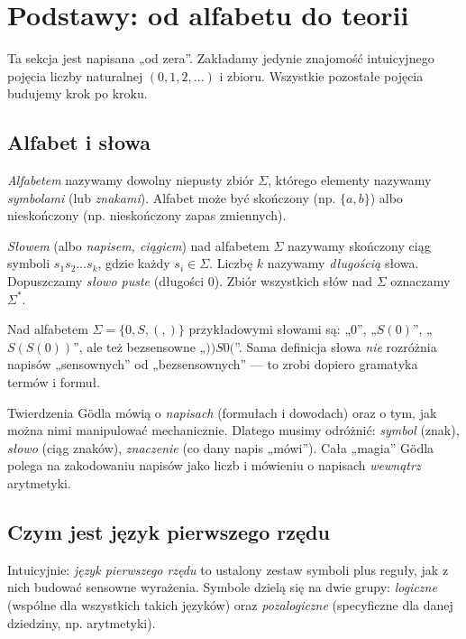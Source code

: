 \section{Podstawy: od alfabetu do teorii}\label{sec:podstawy}
Ta sekcja jest napisana „od zera”. Zakładamy jedynie znajomość intuicyjnego pojęcia liczby naturalnej $(0,1,2,\ldots)$ i zbioru. Wszystkie pozostałe pojęcia budujemy krok po kroku.

\subsection*{Alfabet i słowa}\label{sec:alfabet-slowa}
\begin{definicja}[Alfabet]\label{res:2:1}
\emph{Alfabetem} nazywamy dowolny niepusty zbiór $\Sigma$, którego elementy nazywamy \emph{symbolami} (lub \emph{znakami}). Alfabet może być skończony (np. $\{a,b\}$) albo nieskończony (np. nieskończony zapas zmiennych).
\end{definicja}

\begin{definicja}\label{res:2:2}
\emph{Słowem} (albo \emph{napisem, ciągiem}) nad alfabetem $\Sigma$ nazywamy skończony ciąg symboli $s_1s_2\ldots s_k$, gdzie każdy $s_i\in\Sigma$. Liczbę $k$ nazywamy \emph{długością} słowa. Dopuszczamy \emph{słowo puste} (długości $0$). Zbiór wszystkich słów nad $\Sigma$ oznaczamy $\Sigma^*$.
\end{definicja}

\begin{przyklad}\label{res:2:3}
Nad alfabetem $\Sigma=\{0,S,(,)\}$ przykładowymi słowami są: „$0$”, „$S(0)$”, „$S(S(0))$”, ale też bezsensowne „$))S0($”. Sama definicja słowa \emph{nie} rozróżnia napisów „sensownych” od „bezsensownych” --- to zrobi dopiero gramatyka termów i formuł.
\end{przyklad}

\begin{uwaga}[Po co ta ścisłość?]\label{res:2:4}
Twierdzenia Gödla mówią o \emph{napisach} (formułach i dowodach) oraz o tym, jak można nimi manipulować mechanicznie. Dlatego musimy odróżnić: \emph{symbol} (znak), \emph{słowo} (ciąg znaków), \emph{znaczenie} (co dany napis „mówi”). Cała „magia” Gödla polega na zakodowaniu napisów jako liczb i mówieniu o napisach \emph{wewnątrz} arytmetyki.
\end{uwaga}

\subsection*{Czym jest język pierwszego rzędu}\label{sec:jezyk-pierwszego-rzedu}
Intuicyjnie: \emph{język pierwszego rzędu} to ustalony zestaw symboli plus reguły, jak z nich budować sensowne wyrażenia. Symbole dzielą się na dwie grupy: \emph{logiczne} (wspólne dla wszystkich takich języków) oraz \emph{pozalogiczne} (specyficzne dla danej dziedziny, np. arytmetyki).

